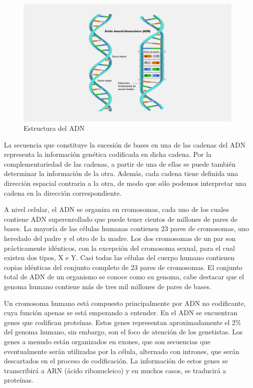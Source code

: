 \begin{figure}[H]
    \centering
    \includegraphics[width=\textwidth]{img/Estructura_del_ADN.jpg}
    \caption{Estructura del ADN \cite{genome}}
\end{figure}

La secuencia que constituye la sucesión de bases en una de las cadenas del ADN representa la información genética codificada en dicha cadena. Por la complementariedad de las cadenas, a partir de una de ellas se puede también determinar la información de la otra. Además, cada cadena tiene definida una dirección espacial contraria a la otra, de modo que sólo podemos interpretar una cadena en la dirección correspondiente.

A nivel celular, el ADN se organiza en cromosomas, cada uno de los cuales contiene ADN superenrollado que puede tener cientos de millones de pares de bases. La mayoría de las células humanas contienen 23 pares de cromosomas, uno heredado del padre y el otro de la madre. Los dos cromosomas de un par son prácticamente idénticos, con la excepción del cromosoma sexual, para el cual existen dos tipos, X e Y. Casi todas las células del cuerpo humano contienen copias idénticas del conjunto completo de 23 pares de cromosomas. El conjunto total de ADN de un organismo se conoce como su genoma, cabe destacar que el genoma humano contiene más de tres mil millones de pares de bases.

Un cromosoma humano está compuesto principalmente por ADN no codificante, cuya función apenas se está empezando a entender. En el ADN se encuentran genes que codifican proteínas. Estos genes representan aproximadamente el $2\%$ del genoma humano, sin embargo, son el foco de atención de los genetistas. Los genes a menudo están organizados en exones, que son secuencias que eventualmente serán utilizadas por la célula, alternado con intrones, que serán descartados en el proceso de codificación. La información de estos genes se transcribirá a ARN (ácido ribonucleico) y en muchos casos, se traducirá a proteínas.

